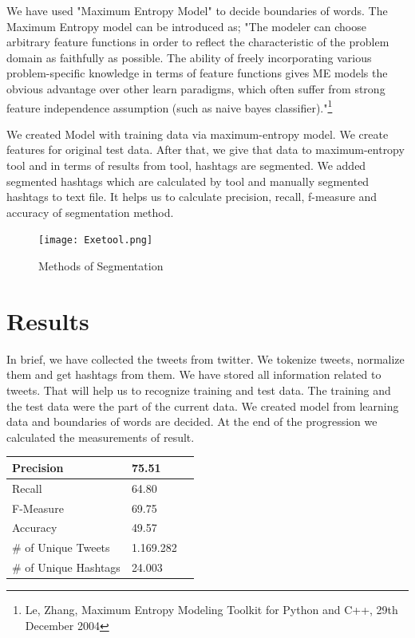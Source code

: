 \documentclass[12pt]{comjnl}
\begin{document}
We have used "Maximum Entropy Model" to decide boundaries of words. The Maximum Entropy model can be introduced as; "The modeler can choose arbitrary feature functions in order to reflect the characteristic of the problem domain as faithfully as possible. The ability of freely incorporating various problem-specific knowledge in terms of feature functions gives ME models the obvious advantage over other learn paradigms, which often suffer from strong feature independence assumption (such as naive bayes classifier)."\footnote{Le, Zhang, Maximum Entropy Modeling Toolkit
for Python and C++, 29th December 2004}

We created Model with training data via maximum-entropy model. We create features for original test data. After that, we give that data to maximum-entropy tool and in terms of results from tool, hashtags are segmented. We added segmented hashtags which are calculated by tool and manually segmented hashtags to text file. It helps us to calculate precision, recall, f-measure and accuracy of segmentation method.

\begin{figure}[htbp]
\centering
\texttt{[image: Exetool.png]}
\caption{Methods of Segmentation}\label{fig:model}
\end{figure}

\section{Results}
In brief, we have collected the tweets from twitter. We tokenize tweets, normalize them and get 
hashtags from them. We have stored all information related to tweets. That will help us to recognize training and test data. The training and the test data were the part of the current data. We created model from learning data and boundaries of words are decided. At the end of the progression we calculated the measurements of result.

\begin{center}
\begin{tabular}{| l | l | p{10cm} |}
\hline
Precision & 75.51\\ \hline
Recall & 64.80\\ \hline
F-Measure & 69.75\\ \hline
Accuracy & 49.57\\ \hline
\# of Unique Tweets & 1.169.282\\ \hline
\# of Unique Hashtags & 24.003\\
\hline
\end{tabular}
\end{center}
\end{document}
